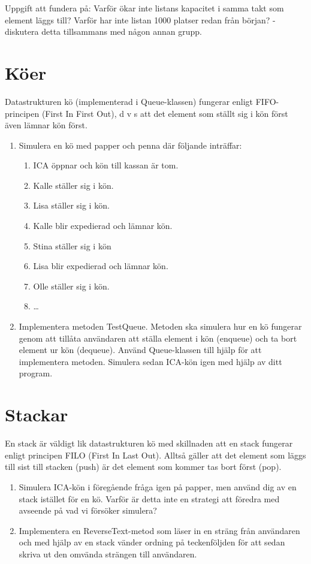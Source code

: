\documentclass{article}
\begin{document}
  
 Uppgift att fundera på: Varför ökar inte listans kapacitet i samma takt som element läggs till? Varför har inte listan 1000 platser redan från början? - diskutera detta tillsammans med någon annan grupp. 

  \section*{Köer}
  Datastrukturen kö (implementerad i Queue-klassen) fungerar enligt FIFO-principen (First
  In First Out), d v s att det element som ställt sig i kön först även lämnar kön först.

  \begin{enumerate}
      \item Simulera en kö med papper och penna där följande inträffar:
	      \begin{enumerate}
	          \item ICA öppnar och kön till kassan är tom.
	          \item Kalle ställer sig i kön.
	          \item Lisa ställer sig i kön.
	          \item Kalle blir expedierad och lämnar kön.
	          \item Stina ställer sig i kön
	          \item Lisa blir expedierad och lämnar kön.
	          \item Olle ställer sig i kön.
	          \item \ldots
	      \end{enumerate}
      \item Implementera metoden TestQueue. Metoden ska simulera hur en kö fungerar genom
      att tillåta användaren att ställa element i kön (enqueue) och ta bort element ur kön
      (dequeue). Använd Queue-klassen till hjälp för att implementera metoden. Simulera
      sedan ICA-kön igen med hjälp av ditt program.
    \end{enumerate}
  \section*{Stackar}
  En stack är väldigt lik datastrukturen kö med skillnaden att en stack fungerar enligt principen FILO (First In Last Out). Alltså gäller att det element som läggs till sist till stacken (push) är det element som kommer tas bort först (pop).
  \begin{enumerate}
  	          \item Simulera ICA-kön i föregående fråga igen på papper, men använd dig av en stack istället för en kö. Varför är detta inte en strategi att föredra med avseende på vad vi försöker simulera?
  	          \item Implementera en ReverseText-metod som läser in en sträng från användaren och med hjälp av en stack vänder ordning på teckenföljden för att sedan skriva ut den omvända strängen till användaren.	          
   \end{enumerate}
   \newpage
\end{document}
